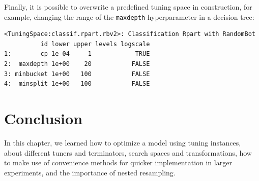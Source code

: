 Finally, it is possible to overwrite a predefined tuning space in
construction, for example, changing the range of the \texttt{maxdepth}
hyperparameter in a decision tree:

\begin{Shaded}
\begin{Highlighting}[]
\NormalTok{(}\NormalTok{, } \NormalTok{(}\NormalTok{, }\NormalTok{))}
\end{Highlighting}
\end{Shaded}

\begin{verbatim}
<TuningSpace:classif.rpart.rbv2>: Classification Rpart with RandomBot
          id lower upper levels logscale
1:        cp 1e-04     1            TRUE
2:  maxdepth 1e+00    20           FALSE
3: minbucket 1e+00   100           FALSE
4:  minsplit 1e+00   100           FALSE
\end{verbatim}

\hypertarget{conclusion-2}{%
\section{Conclusion}\label{conclusion-2}}

In this chapter, we learned how to optimize a model using tuning
instances, about different tuners and terminators, search spaces and
transformations, how to make use of convenience methods for quicker
implementation in larger experiments, and the importance of nested
resampling.

